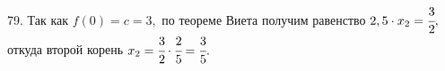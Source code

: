 79. Так как $f(0)=c=3,$ по теореме Виета получим равенство $2,5\cdot x_2=\cfrac{3}{2},$ откуда второй корень $x_2=\cfrac{3}{2}\cdot\cfrac{2}{5}=\cfrac{3}{5}.$\\
